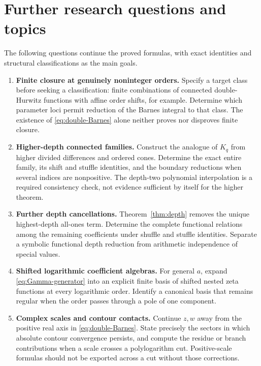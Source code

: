 \documentclass[11pt]{article}
\numberwithin{equation}{section}
\theoremstyle{definition}
\begin{document}
\section{Further research questions and topics}\label{sec:research}
The following questions continue the proved formulas, with exact identities and structural classifications as the main goals.
\begin{enumerate}[label=\textbf{Q\arabic*.},leftmargin=2.8em,itemsep=7pt]
\item \textbf{Finite closure at genuinely noninteger orders.}
Specify a target class before seeking a classification: finite combinations of connected double-Hurwitz functions with affine order shifts, for example. Determine which parameter loci permit reduction of the Barnes integral to that class. The existence of \eqref{eq:double-Barnes} alone neither proves nor disproves finite closure.

\item \textbf{Higher-depth connected families.}
Construct the analogue of $K_q$ from higher divided differences and ordered cones. Determine the exact entire family, its shift and stuffle identities, and the boundary reductions when several indices are nonpositive. The depth-two polynomial interpolation is a required consistency check, not evidence sufficient by itself for the higher theorem.

\item \textbf{Further depth cancellations.}
Theorem~\ref{thm:depth} removes the unique highest-depth all-ones term. Determine the complete functional relations among the remaining coefficients under shuffle and stuffle identities. Separate a symbolic functional depth reduction from arithmetic independence of special values.

\item \textbf{Shifted logarithmic coefficient algebras.}
For general $a$, expand \eqref{eq:Gamma-generator} into an explicit finite basis of shifted nested zeta functions at every logarithmic order. Identify a canonical basis that remains regular when the order passes through a pole of one component.

\item \textbf{Complex scales and contour contacts.}
Continue $z,w$ away from the positive real axis in \eqref{eq:double-Barnes}. State precisely the sectors in which absolute contour convergence persists, and compute the residue or branch contributions when a scale crosses a polylogarithm cut. Positive-scale formulas should not be exported across a cut without those corrections.


\end{enumerate}
\end{document}
